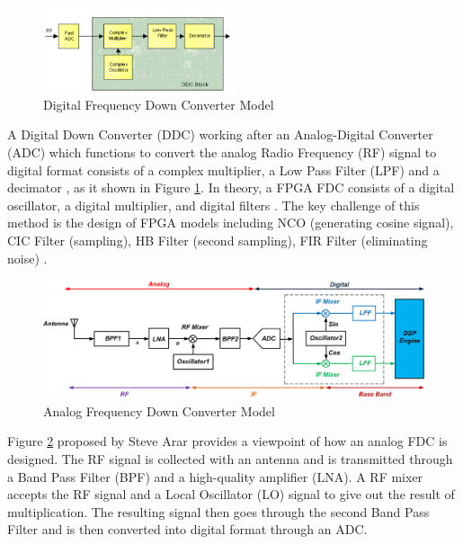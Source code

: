 \documentclass[12pt, a4paper]{report}
\begin{document}
\newpage

\begin{figure}[htbp]     \begin{centering}
    \includegraphics[width=0.5\textwidth]{img/ddcb.png}
    \caption{\label{Fig:ddcb}Digital Frequency Down Converter Model \cite{hunteng.co.uk}}
    \end{centering}
\end{figure}

A Digital Down Converter (DDC) working after an Analog-Digital Converter (ADC) which functions to convert the analog Radio Frequency (RF) signal to digital format consists of a complex multiplier, a Low Pass Filter (LPF) and a decimator \cite{hunteng.co.uk}, as it shown in Figure \ref{Fig:ddcb}. In theory, a FPGA FDC consists of a digital oscillator, a digital multiplier, and digital filters \cite{yang}. The key challenge of this method is the design of FPGA models including NCO (generating cosine signal), CIC Filter (sampling), HB Filter (second sampling), FIR Filter (eliminating noise) \cite{xu}.


\begin{figure}[htbp]     \begin{centering}
    \includegraphics[width=1.0\textwidth]{img/ddc.png}
    \caption{\label{Fig:ddc}Analog Frequency Down Converter Model \cite{ref:ddc}}
    \end{centering}
\end{figure}

Figure \ref{Fig:ddc} proposed by Steve Arar \cite{ref:ddc} provides a viewpoint of how an analog FDC is designed. The RF signal is collected with an antenna and is transmitted through a Band Pass Filter (BPF) and a high-quality amplifier (LNA). A RF mixer accepts the RF signal and a Local Oscillator (LO) signal to give out the result of multiplication. The resulting signal then goes through the second Band Pass Filter and is then converted into digital format through an ADC.
\end{document}
